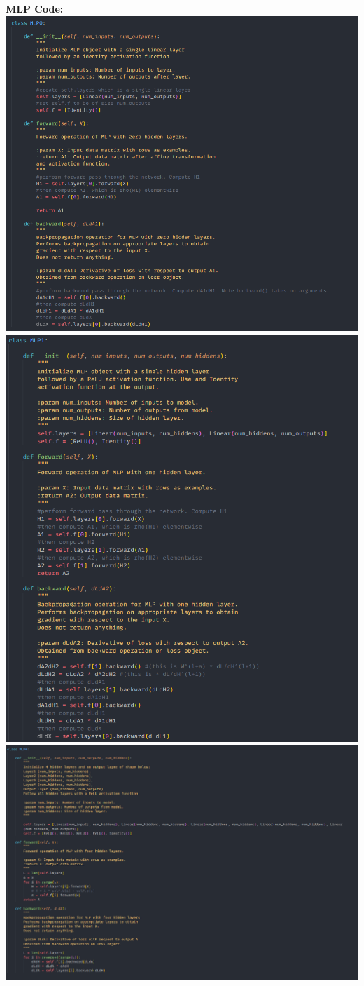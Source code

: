 \documentclass{article}[12pt]
\begin{document}
\textbf{MLP Code:}\\
\includegraphics[width=1\textwidth]{MLP0.png}
\includegraphics[width=1\textwidth]{MLP1.png}
\includegraphics[width=1\textwidth]{MLP2.png}
\end{document}
